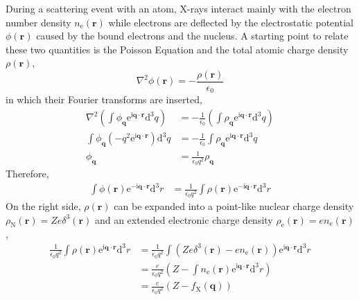 During a scattering event with an atom, X-rays interact mainly with
the electron number density $n_\text{e}(\boldsymbol{r})$
while electrons are deflected by the electrostatic potential $\phi(\boldsymbol{r})$
caused by the bound electrons and the nucleus.
%
A starting point to relate these two quantities is the Poisson Equation
and the total atomic charge density~$\rho(\boldsymbol{r})$,
%
\begin{equation}
  \nabla^2 \phi(\boldsymbol{r}) = -\frac{\rho(\boldsymbol{r})}{\epsilon_0}
\end{equation}
%
in which their Fourier transforms are inserted,
%
\begin{equation}
  \begin{aligned}
    \nabla^2 \left( \int \phi_{\boldsymbol{q}} \mathrm{e}^{ \mathrm{i} \boldsymbol{q} \cdot \boldsymbol{r} } \mathrm{d}^3 q \right)
      & = -\frac{1}{\epsilon_0} \left( \int \rho_{\boldsymbol{q}} \mathrm{e}^{\mathrm{i} \boldsymbol{q} \cdot \boldsymbol{r}} \mathrm{d}^3 q \right) \\
    \int \phi_{\boldsymbol{q}} \left( -q^2 \mathrm{e}^{\mathrm{i} \boldsymbol{q} \cdot \boldsymbol{r}} \right) \mathrm{d}^3 q
      & = -\frac{1}{\epsilon_0} \int \rho_{\boldsymbol{q}} \mathrm{e}^{\mathrm{i} \boldsymbol{q} \cdot \boldsymbol{r}} \mathrm{d}^3 q \\
    \phi_{\boldsymbol{q}} & = \frac{1}{\epsilon_0 q^2} \rho_{\boldsymbol{q}}
  \end{aligned}
\end{equation}
%
Therefore,
%
\begin{equation}
  \begin{aligned}
    \int \phi(\boldsymbol{r}) \mathrm{e}^{ - \mathrm{i} \boldsymbol{q} \cdot \boldsymbol{r}} \mathrm{d}^3 r
      & = \frac{1}{\epsilon_0 q^2} \int \rho(\boldsymbol{r}) \mathrm{e}^{ - \mathrm{i} \boldsymbol{q} \cdot \boldsymbol{r}} \mathrm{d}^3 r
  \end{aligned}
\end{equation}
%
On the right side, $\rho(\boldsymbol{r})$ can be expanded into a point-like nuclear charge density
$\rho_\text{N}(\boldsymbol{r}) = Z e \delta^3(\boldsymbol{r})$ and an extended electronic charge density $\rho_\text{e}(\boldsymbol{r}) = e n_\text{e}(\boldsymbol{r})$,
%
\begin{equation}
  \begin{aligned}
    \frac{1}{\epsilon_0 q^2} \int \rho(\boldsymbol{r}) \mathrm{e}^{\mathrm{i} \boldsymbol{q} \cdot \boldsymbol{r}} \mathrm{d}^3 r
      & = \frac{1}{\epsilon_0 q^2} \int \left( Z e \delta^3(\boldsymbol{r}) - e n_\text{e}(\boldsymbol{r}) \right) \mathrm{e}^{\mathrm{i} \boldsymbol{q} \cdot \boldsymbol{r}} \mathrm{d}^3 r \\
      & = \frac{e}{\epsilon_0 q^2} \left( Z - \int n_\text{e}(\boldsymbol{r}) \mathrm{e}^{\mathrm{i} \boldsymbol{q} \cdot \boldsymbol{r}} \mathrm{d}^3 r \right) \\
      & = \frac{e}{\epsilon_0 q^2} \left( Z - f_\text{X}(\boldsymbol{q}) \right)
  \end{aligned}
\end{equation}

